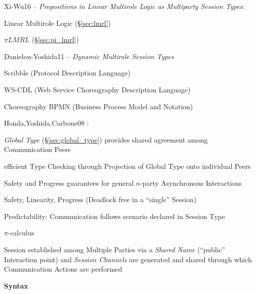 Xi-Wu16 -- \emph{Propositions in Linear Multirole Logic as
  Multiparty Session Types}:

Linear Multirole Logic (\S\ref{sec:lmrl})

$\pi LMRL$ (\S\ref{sec:pi_lmrl})

Danielou-Yoshida11 -- \emph{Dynamic Multirole Session Types}

\fist Scribble (Protocol Description Language)

\fist WS-CDL (Web Service Choreography Description Language)

\fist Choreography BPMN (Business Process Model and Notation)


\asterism


Honda,Yoshida,Carbone08 \cite{honda-yoshida-carbone08}:

\emph{Global Type} (\S\ref{sec:global_type}) provides shared agreement among
Communication Peers

efficient Type Checking through Projection of Global Type onto
individual Peers

Safety and Progress guarantees for general $n$-party Asynchronous
Interactions

Safety, Linearity, Progress (Deadlock free in a ``single'' Session)

Predictability: Communication follows scenario declared in Session
Type

$\pi$-calculus

Session established among Multiple Parties via a \emph{Shared Name}
(``public'' Interaction point) and \emph{Session Channels} are
generated and shared through which Communication Actions are performed


\textbf{Syntax}

